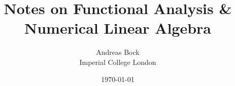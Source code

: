 \documentclass[11pt]{report}
\def\Author{Andreas Bock\\[0.3cm] Imperial College London}
\begin{document}
\title{Notes on Functional Analysis \& Numerical Linear Algebra}
\author{\Author}
\date{\today}
\maketitle
\tableofcontents
\newpage




\end{document}

